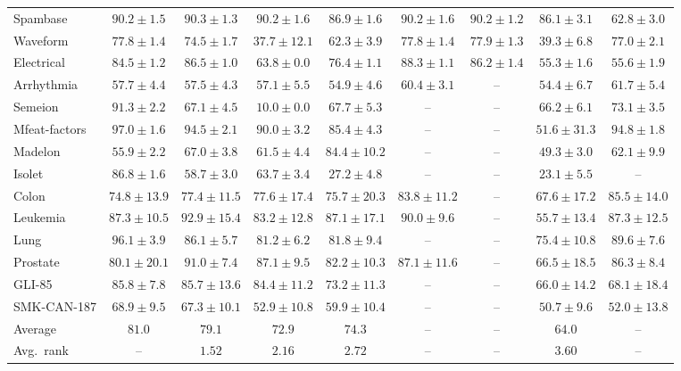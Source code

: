 \begin{minipage}{\linewidth}
{\begin{tabular}{@{}l*{8}{c}@{}}
\midrule
Spambase & $90.2 \pm 1.5$ & $\mathbf{90.3} \pm 1.3$ & $90.2 \pm 1.6$ & $86.9 \pm 1.6$ & $90.2 \pm 1.6$ & $90.2 \pm 1.2$ & $86.1 \pm 3.1$ & $62.8 \pm 3.0$ \\
Waveform & $77.8 \pm 1.4$ & $74.5 \pm 1.7$ & $37.7 \pm 12.1$ & $62.3 \pm 3.9$ & $77.8 \pm 1.4$ & $\mathbf{77.9} \pm 1.3$ & $39.3 \pm 6.8$ & $77.0 \pm 2.1$ \\
Electrical & $84.5 \pm 1.2$ & $86.5 \pm 1.0$ & $63.8 \pm 0.0$ & $76.4 \pm 1.1$ & $\mathbf{88.3} \pm 1.1$ & $86.2 \pm 1.4$ & $55.3 \pm 1.6$ & $55.6 \pm 1.9$ \\
\midrule
Arrhythmia & $57.7 \pm 4.4$ & $57.5 \pm 4.3$ & $57.1 \pm 5.5$ & $54.9 \pm 4.6$ & $60.4 \pm 3.1$ & -- & $54.4 \pm 6.7$ & $\mathbf{61.7} \pm 5.4$ \\
Semeion & $91.3 \pm 2.2$ & $67.1 \pm 4.5$ & $10.0 \pm 0.0$ & $67.7 \pm 5.3$ & -- & -- & $66.2 \pm 6.1$ & $\mathbf{73.1} \pm 3.5$ \\
Mfeat-factors & $97.0 \pm 1.6$ & $94.5 \pm 2.1$ & $90.0 \pm 3.2$ & $85.4 \pm 4.3$ & -- & -- & $51.6 \pm 31.3$ & $\mathbf{94.8} \pm 1.8$ \\
Madelon & $55.9 \pm 2.2$ & $67.0 \pm 3.8$ & $61.5 \pm 4.4$ & $\mathbf{84.4} \pm 10.2$ & -- & -- & $49.3 \pm 3.0$ & $62.1 \pm 9.9$ \\
Isolet & $86.8 \pm 1.6$ & $58.7 \pm 3.0$ & $\mathbf{63.7} \pm 3.4$ & $27.2 \pm 4.8$ & -- & -- & $23.1 \pm 5.5$ & -- \\
\midrule
Colon & $74.8 \pm 13.9$ & $77.4 \pm 11.5$ & $77.6 \pm 17.4$ & $75.7 \pm 20.3$ & $83.8 \pm 11.2$ & -- & $67.6 \pm 17.2$ & $\mathbf{85.5} \pm 14.0$ \\
Leukemia & $87.3 \pm 10.5$ & $\mathbf{92.9} \pm 15.4$ & $83.2 \pm 12.8$ & $87.1 \pm 17.1$ & $90.0 \pm 9.6$ & -- & $55.7 \pm 13.4$ & $87.3 \pm 12.5$ \\
Lung & $96.1 \pm 3.9$ & $86.1 \pm 5.7$ & $81.2 \pm 6.2$ & $81.8 \pm 9.4$ & -- & -- & $75.4 \pm 10.8$ & $\mathbf{89.6} \pm 7.6$ \\
Prostate & $80.1 \pm 20.1$ & $\mathbf{91.0} \pm 7.4$ & $87.1 \pm 9.5$ & $82.2 \pm 10.3$ & $87.1 \pm 11.6$ & -- & $66.5 \pm 18.5$ & $86.3 \pm 8.4$ \\
GLI-85 & $85.8 \pm 7.8$ & $\mathbf{85.7} \pm 13.6$ & $84.4 \pm 11.2$ & $73.2 \pm 11.3$ & -- & -- & $66.0 \pm 14.2$ & $68.1 \pm 18.4$ \\
SMK-CAN-187 & $68.9 \pm 9.5$ & $\mathbf{67.3} \pm 10.1$ & $52.9 \pm 10.8$ & $59.9 \pm 10.4$ & -- & -- & $50.7 \pm 9.6$ & $52.0 \pm 13.8$ \\
\midrule
Average & $81.0$ & $79.1$ & $72.9$ & $74.3$ & -- & -- & $64.0$ & -- \\
Avg.\ rank & -- & $1.52$ & $2.16$ & $2.72$ & -- & -- & $3.60$ & -- \\
\bottomrule
\end{tabular}%
}
\end{minipage}\par
